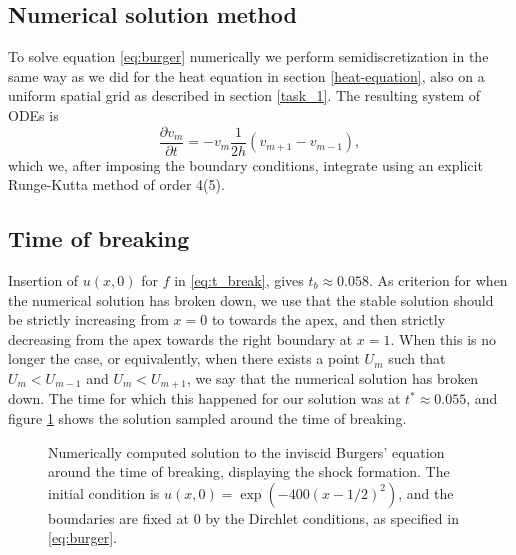\subsection*{Numerical solution method}
To solve equation \eqref{eq:burger} numerically we perform semidiscretization in the same way as we did for the heat equation in section \ref{heat-equation}, 
also on a uniform spatial grid as described in section \ref{task_1}. 
The resulting system of ODEs is
\begin{equation*}
    \frac{\partial v_m}{\partial t} = -v_m \frac{1}{2h} (v_{m+1} - v_{m-1}), 
\end{equation*}
which we, after imposing the boundary conditions, 
integrate using an explicit Runge-Kutta method of order 4(5). 

%    

\subsection{Time of breaking}
Insertion of $u(x, 0)$ for $f$ in \eqref{eq:t_break}, 
gives $t_b \approx 0.058$. 
As criterion for when the numerical solution has broken down, 
we use that the stable solution should be strictly increasing from $x=0$ to towards the apex, 
and then strictly decreasing from the apex towards the right boundary at $x=1$. 
When this is no longer the case, 
or equivalently, 
when there exists a point $U_m$ such that $U_m < U_{m-1}$ and $U_m < U_{m+1}$, 
we say that the numerical solution has broken down. 
The time for which this happened for our solution was at $t^* \approx 0.055$, 
and figure \ref{fig:burgers-samples} shows the solution sampled around the time of breaking. 

\begin{figure}[ht]
    \centering
    
    \caption{
        Numerically computed solution to the inviscid Burgers' equation around the time of breaking, 
        displaying the shock formation. 
        The initial condition is $u(x, 0) = \exp(-400(x-1/2)^2)$, 
        and the boundaries are fixed at $0$ by the Dirchlet conditions, 
        as specified in \eqref{eq:burger}. 
    }
    \label{fig:burgers-samples}
\end{figure}
